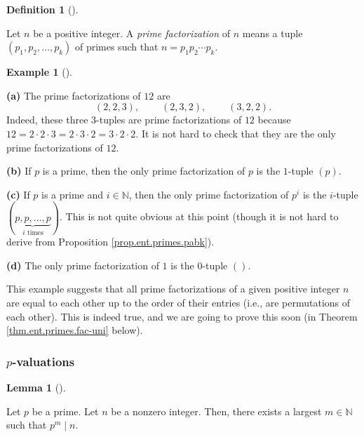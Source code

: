 \documentclass[numbers=enddot,12pt,final,onecolumn,notitlepage]{scrartcl}%
\numberwithin{exer}{subsection}
\theoremstyle{definition}
\newtheorem{lem}[theo]{Lemma}
\newenvironment{lemma}[1][]
{\begin{lem}[#1]\begin{leftbar}}
{\end{leftbar}\end{lem}}
\newtheorem{defi}[theo]{Definition}
\newenvironment{definition}[1][]
{\begin{defi}[#1]\begin{leftbar}}
{\end{leftbar}\end{defi}}
\newtheorem{exam}[theo]{Example}
\newenvironment{example}[1][]
{\begin{exam}[#1]\begin{leftbar}}
{\end{leftbar}\end{exam}}
\begin{document}
\begin{definition}
Let $n$ be a positive integer. A \textit{prime factorization} of $n$ means a
tuple $\left(  p_{1},p_{2},\ldots,p_{k}\right)  $ of primes such that
$n=p_{1}p_{2}\cdots p_{k}$.
\end{definition}

\begin{example}
\textbf{(a)} The prime factorizations of $12$ are%
\[
\left(  2,2,3\right)  ,\ \ \ \ \ \ \ \ \ \ \left(  2,3,2\right)
,\ \ \ \ \ \ \ \ \ \ \left(  3,2,2\right)  .
\]
Indeed, these three $3$-tuples are prime factorizations of $12$ because
$12=2\cdot2\cdot3=2\cdot3\cdot2=3\cdot2\cdot2$. It is not hard to check that
they are the only prime factorizations of $12$.

\textbf{(b)} If $p$ is a prime, then the only prime factorization of $p$ is
the $1$-tuple $\left(  p\right)  $.

\textbf{(c)} If $p$ is a prime and $i\in\mathbb{N}$, then the only prime
factorization of $p^{i}$ is the $i$-tuple $\left(  \underbrace{p,p,\ldots
,p}_{i\text{ times}}\right)  $. This is not quite obvious at this point
(though it is not hard to derive from Proposition \ref{prop.ent.primes.pabk}).

\textbf{(d)} The only prime factorization of $1$ is the $0$-tuple $\left(
{}\right)  $.
\end{example}

This example suggests that all prime factorizations of a given positive
integer $n$ are equal to each other up to the order of their entries (i.e.,
are permutations of each other). This is indeed true, and we are going to
prove this soon (in Theorem \ref{thm.ent.primes.fac-uni} below).

\subsubsection{$p$-valuations}

\begin{lemma}
\label{lem.ent.prime.vp-wd}Let $p$ be a prime. Let $n$ be a nonzero integer.
Then, there exists a largest $m\in\mathbb{N}$ such that $p^{m}\mid n$.
\end{lemma}
\end{document}
